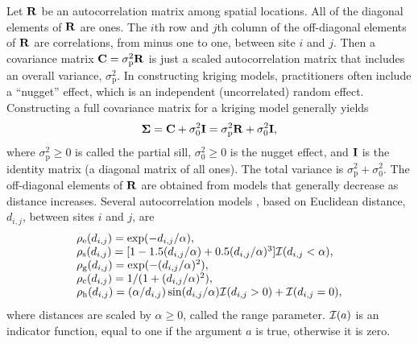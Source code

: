 \documentclass[11pt, titlepage]{article}\usepackage[]{graphicx}\usepackage[]{color}
\begin{document}
\begin{spacing}{1.9}
\begin{flushleft}
Let $\mathbf{R}$ be an autocorrelation matrix among spatial locations.  All of the diagonal elements of $\mathbf{R}$ are ones. The $i$th row and $j$th column of the off-diagonal elements of $\mathbf{R}$ are correlations, from minus one to one, between site $i$ and $j$.  Then a covariance matrix $\mathbf{C} = \sigma^2_\textrm{p}\mathbf{R}$ is just a scaled autocorrelation matrix that includes an overall variance, $\sigma^2_\textrm{p}$.  In constructing kriging models, practitioners often include a ``nugget'' effect, which is an independent (uncorrelated) random effect.  Constructing a full covariance matrix for a kriging model generally yields
\begin{equation} \label{eq:bSigma}
	\mbox{\boldmath $\Sigma$} = \mathbf{C} + \sigma^2_0\mathbf{I} = \sigma^2_\textrm{p}\mathbf{R} + \sigma^2_0\mathbf{I},
\end{equation}
where $\sigma^2_\textrm{p} \ge 0$ is called the partial sill, $\sigma^2_0 \ge 0$ is the nugget effect, and $\mathbf{I}$ is the identity matrix (a diagonal matrix of all ones). The total variance is $\sigma^2_\textrm{p} + \sigma^2_0$.  The off-diagonal elements of $\mathbf{R}$ are obtained from models that generally decrease as distance increases. Several autocorrelation models \citep[][p. 80--93]{Chil:Delf:geos:1999}, based on Euclidean distance, $d_{i,j}$, between sites $i$ and $j$, are
\begin{equation} \label{eq:autocorrModels}
	\begin{array}{l}
  \rho_{\textrm{e}}(d_{i,j}) = \exp(-d_{i,j}/\alpha), \\
  \rho_{\textrm{s}}(d_{i,j}) = [1 - 1.5(d_{i,j}/\alpha) + 0.5(d_{i,j}/\alpha)^3] \mathcal{I}(d_{i,j} < \alpha), \\
  \rho_{\textrm{g}}(d_{i,j}) = \exp(-(d_{i,j}/\alpha)^2), \\
	\rho_{\textrm{c}}(d_{i,j}) = 1/(1+(d_{i,j}/\alpha)^2), \\
	\rho_{\textrm{h}}(d_{i,j}) = (\alpha/d_{i,j})\sin(d_{i,j}/\alpha)\mathcal{I}(d_{i,j} > 0) + \mathcal{I}(d_{i,j} = 0),
	\end{array}
\end{equation}
where distances are scaled by $\alpha \ge 0$, called the range parameter. $\mathcal{I}(a)$ is an indicator function, equal to one if the argument $a$ is true, otherwise it is zero.


\end{flushleft}
\end{spacing}
\end{document}

